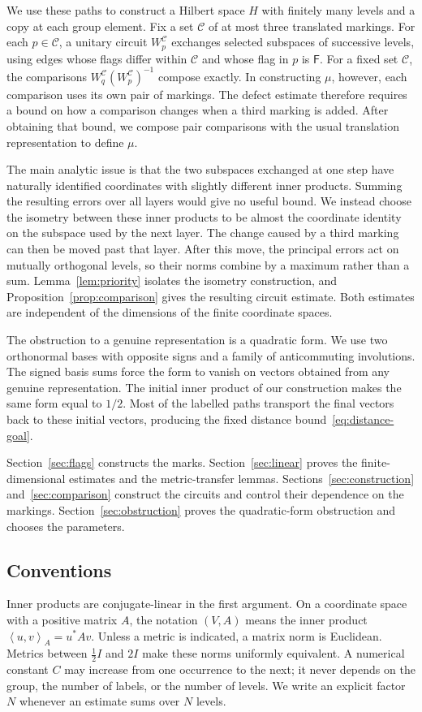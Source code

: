 \documentclass[11pt]{article}
\numberwithin{equation}{section}
\theoremstyle{definition}
\theoremstyle{remark}
\newcommand{\ip}[2]{\left\langle#1,#2\right\rangle}
\newcommand{\F}{\mathsf F}
\newcommand{\cC}{\mathcal C}
\begin{document}
We use these paths to construct a Hilbert space $H$ with finitely many
levels and a copy at each group element. Fix a set $\cC$ of at most three
translated markings. For each $p\in\cC$, a unitary circuit $W_p^{\cC}$
exchanges selected subspaces of successive levels, using edges whose flags
differ within $\cC$ and whose flag in $p$ is $\F$.
For a fixed set $\cC$, the comparisons
$W_q^{\cC}(W_p^{\cC})^{-1}$ compose exactly. In constructing $\mu$, however,
each comparison uses its own pair of markings. The defect estimate
therefore requires a bound on how a comparison changes when a third
marking is added. After obtaining that bound, we compose pair comparisons
with the usual translation representation to define $\mu$.

The main analytic issue is that the two subspaces exchanged at one step
have naturally identified coordinates with slightly different inner products.
Summing the resulting errors over all layers would give no useful bound.
We instead choose the isometry between these inner products
to be almost the coordinate identity on the subspace used by the next
layer. The change caused by a third marking can then be moved past that
layer. After this move, the principal errors act on mutually orthogonal
levels, so their norms combine by a maximum rather than a sum.
Lemma~\ref{lem:priority} isolates the isometry construction, and
Proposition~\ref{prop:comparison} gives the resulting circuit estimate.
Both estimates are independent of the dimensions of the finite coordinate
spaces.

The obstruction to a genuine representation is a quadratic form. We use
two orthonormal bases with opposite signs and a family of anticommuting
involutions. The signed basis sums force the form to vanish on vectors
obtained from any genuine representation. The initial inner product of
our construction makes the same form equal to $1/2$. Most of the labelled
paths transport the final vectors back to these initial vectors, producing
the fixed distance bound~\eqref{eq:distance-goal}.

Section~\ref{sec:flags} constructs the marks. Section~\ref{sec:linear}
proves the finite-dimensional estimates and the metric-transfer lemmas.
Sections~\ref{sec:construction} and~\ref{sec:comparison} construct the
circuits and control their dependence on the markings.
Section~\ref{sec:obstruction} proves the quadratic-form obstruction and
chooses the parameters.

\subsection*{Conventions}
Inner products are conjugate-linear in the first argument. On a coordinate
space with a positive matrix $A$, the notation $(V,A)$ means the inner
product $\ip{u}{v}_A=u^*Av$. Unless a metric is indicated, a matrix norm is
Euclidean. Metrics between $\frac12 I$ and $2I$ make these norms uniformly
equivalent. A numerical constant $C$ may increase from one occurrence to
the next; it never depends on the group, the number of labels, or the
number of levels. We write an explicit factor $N$ whenever an estimate
sums over $N$ levels.
\end{document}
